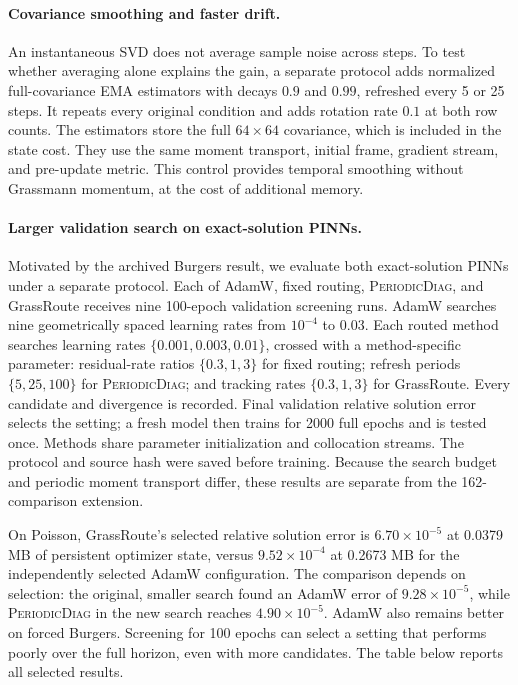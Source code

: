 \paragraph{Covariance smoothing and faster drift.}
An instantaneous SVD does not average sample noise across steps. To test
whether averaging alone explains the gain, a separate protocol adds
normalized full-covariance EMA estimators with decays $0.9$ and $0.99$,
refreshed every 5 or 25 steps. It repeats every original condition and adds
rotation rate $0.1$ at both row counts. The estimators store the full
$64\times64$ covariance, which is included in the state cost. They use
the same moment transport, initial frame, gradient stream, and pre-update
metric. This control provides temporal smoothing without Grassmann momentum,
at the cost of additional memory.


\paragraph{Larger validation search on exact-solution PINNs.}
Motivated by the archived Burgers result, we evaluate both exact-solution
PINNs under a separate protocol. Each of AdamW, fixed routing,
\textsc{PeriodicDiag}, and GrassRoute receives nine 100-epoch validation
screening runs. AdamW searches nine geometrically spaced learning rates from
$10^{-4}$ to $0.03$. Each routed method searches learning rates
$\{0.001,0.003,0.01\}$, crossed with a method-specific parameter:
residual-rate ratios $\{0.3,1,3\}$ for fixed routing; refresh periods
$\{5,25,100\}$ for \textsc{PeriodicDiag}; and tracking rates
$\{0.3,1,3\}$ for GrassRoute. Every candidate and divergence is recorded. Final validation relative
solution error selects the setting; a fresh model then trains for 2000 full
epochs and is tested once. Methods share parameter initialization and
collocation streams. The protocol and source hash were saved before
training. Because the search budget and periodic moment transport differ,
these results are separate from the 162-comparison extension.

On Poisson, GrassRoute's selected relative solution error is
$6.70\times10^{-5}$ at 0.0379 MB of persistent optimizer state, versus
$9.52\times10^{-4}$ at 0.2673 MB for the independently selected AdamW
configuration. The comparison depends on selection: the original, smaller search found
an AdamW error of $9.28\times10^{-5}$, while \textsc{PeriodicDiag} in
the new search reaches $4.90\times10^{-5}$. AdamW also remains better on
forced Burgers. Screening for 100 epochs can select a setting that performs
poorly over the full horizon, even with more candidates. The table below
reports all selected results.

